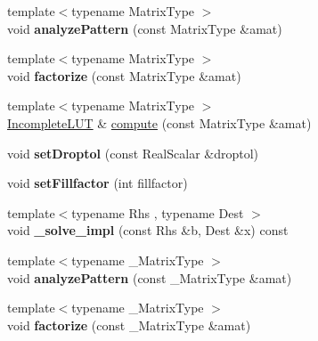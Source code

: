 \begin{DoxyCompactItemize}
\mbox{\label{group___iterative_linear_solvers___module_ae732858eb360316a1573f91eaba8855f}} 
{\footnotesize template$<$typename Matrix\+Type $>$ }\\void {\bfseries analyze\+Pattern} (const Matrix\+Type \&amat)
\item 
\mbox{\label{group___iterative_linear_solvers___module_a2bd72541bcaeb2dee2540b911c151f41}} 
{\footnotesize template$<$typename Matrix\+Type $>$ }\\void {\bfseries factorize} (const Matrix\+Type \&amat)
\item 
{\footnotesize template$<$typename Matrix\+Type $>$ }\\\hyperlink{group___iterative_linear_solvers___module_class_eigen_1_1_incomplete_l_u_t}{Incomplete\+L\+UT} \& \hyperlink{group___iterative_linear_solvers___module_a488e37ab51d8ed37a297eeca521f1817}{compute} (const Matrix\+Type \&amat)
\item 
\mbox{\label{group___iterative_linear_solvers___module_a4a94d9ecdc3cb6b498b429ef7110dfad}} 
void {\bfseries set\+Droptol} (const Real\+Scalar \&droptol)
\item 
\mbox{\label{group___iterative_linear_solvers___module_a9c541a4368149c94caf132e915df94da}} 
void {\bfseries set\+Fillfactor} (int fillfactor)
\item 
\mbox{\label{group___iterative_linear_solvers___module_a33ddb6572db03a6dd90982b1c0540322}} 
{\footnotesize template$<$typename Rhs , typename Dest $>$ }\\void {\bfseries \+\_\+solve\+\_\+impl} (const Rhs \&b, Dest \&x) const
\item 
\mbox{\label{group___iterative_linear_solvers___module_a26d1c2b368a38e4c6d0eadbd9a468acf}} 
{\footnotesize template$<$typename \+\_\+\+Matrix\+Type $>$ }\\void {\bfseries analyze\+Pattern} (const \+\_\+\+Matrix\+Type \&amat)
\item 
\mbox{\label{group___iterative_linear_solvers___module_a871ae479e546b8c3fc1b4047fe6e06de}} 
{\footnotesize template$<$typename \+\_\+\+Matrix\+Type $>$ }\\void {\bfseries factorize} (const \+\_\+\+Matrix\+Type \&amat)
\end{DoxyCompactItemize}
